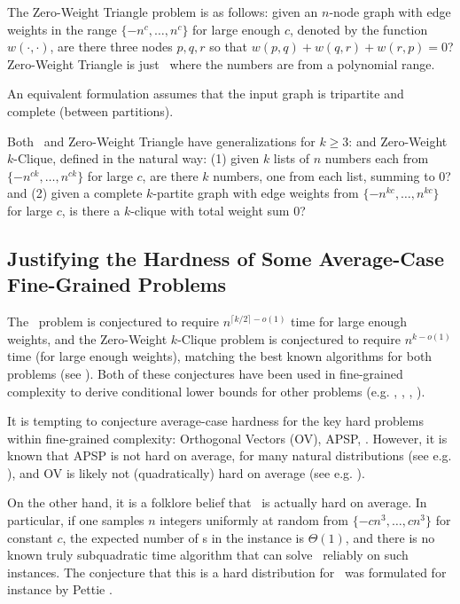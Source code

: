 The Zero-Weight Triangle problem is as follows: given an $n$-node graph with edge weights in the range $\{-n^c,\ldots,n^c\}$ for large enough $c$, denoted by the function $w(\cdot, \cdot)$, are there three nodes $p,q,r$ so that $w(p,q)+w(q,r)+w(r,p)=0$? Zero-Weight Triangle is just \zThclique~where the numbers are from a polynomial range.

An equivalent formulation assumes that the input graph is tripartite and complete (between partitions).

Both \ThSum~and Zero-Weight Triangle have generalizations for $k\geq 3$: \kSum and Zero-Weight $k$-Clique, defined in the natural way: (1) given $k$ lists of $n$ numbers each from $\{-n^{ck},\ldots,n^{ck}\}$ for large $c$, are there $k$ numbers, one from each list, summing to $0$? and (2) given a complete $k$-partite graph with edge weights from $\{-n^{kc},\ldots,n^{kc}\}$ for large $c$, is there a $k$-clique with total weight sum $0$?

\subsection{Justifying the Hardness of Some Average-Case Fine-Grained Problems}
The \kSum~problem is conjectured to require $n^{\lceil k/2\rceil-o(1)}$ time for large enough weights, and the Zero-Weight $k$-Clique problem is conjectured to require $n^{k-o(1)}$ time (for large enough weights), matching the best known algorithms for both problems (see \cite{icm-survey}). Both of these conjectures have been used in fine-grained complexity to derive conditional lower bounds for other problems (e.g. \cite{BackursT16},  \cite{abboud2014consequences}, \cite{sparseGraphsLVWW}, \cite{treeEditDistance}).

It is tempting to conjecture average-case hardness for the key hard problems within fine-grained complexity: Orthogonal Vectors (OV), APSP, \ThSum. However, it is known that APSP is not hard on average, for many natural distributions (see e.g. \cite{PeresSSZ13,averageAPSP}), and OV is likely not (quadratically) hard on average (see e.g. \cite{KW17}).

On the other hand, it is a folklore belief that \ThSum~is actually hard on average.
In particular, if one samples $n$ integers uniformly at random from $\{-cn^3,\ldots,cn^3\}$ for constant $c$, the expected number of \ThSum s in the instance is $\Theta(1)$, and there is no known truly subquadratic time algorithm that can solve \ThSum~reliably on such instances. The conjecture that this is a hard distribution for \ThSum~was formulated for instance by Pettie \cite{avgCase3Sum}. 

